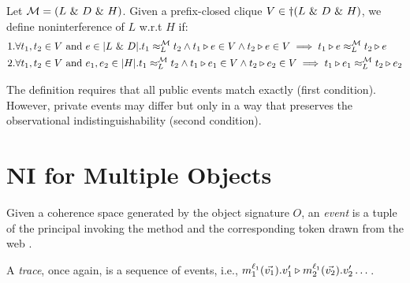 \documentclass[acmsmall,screen,review, nonacm]{acmart}
\begin{document}
\medskip
    {
      \color{blue}
\begin{definition}\label{def:relaxninew}
   Let $\classpart = (L \directprod D \directprod H)$. Given a prefix-closed clique $V \in \dagger(L \directprod D \directprod H)$, we define noninterference of $L$ w.r.t $H$ if:
   \begin{align*}
     & 1. \forall t_1, t_2 \in V \text{ and }  e \in \abs{L \directprod D}. \treq{t_1}{t_2}{L}{\classpart}  \wedge t_1 \tracecat e \in V \wedge t_2 \tracecat  e \in V \implies \treq{t_1  \tracecat  e}{t_2 \tracecat  e}{L}{\classpart} \\
     & 2. \forall t_1, t_2 \in V \text{ and }  e_1, e_2 \in \abs{H}. \treq{t_1}{t_2}{L}{\classpart}  \wedge t_1 \tracecat e_1 \in V \wedge t_2 \tracecat  e_2 \in V \implies \treq{t_1  \tracecat  e_1}{t_2 \tracecat  e_2}{L}{\classpart}
   \end{align*}
\end{definition}
}

The definition requires that all public events match exactly (first condition). However, private events may differ but only in a way that preserves the observational indistinguishability (second condition).

    

\section{NI for Multiple Objects}


\begin{definition}
Given a coherence space generated by the object signature $O$, an \emph{event} is a tuple of the principal invoking the method and the corresponding token drawn from the web .

A \emph{trace}, once again, is a sequence of events, i.e., $ m_1^{\ell_1}(\vec{v_1}).v'_1 \tracecat m_2^{\ell_1}(\vec{v_2}).v'_2 \dots $.

\end{definition}
\end{document}
